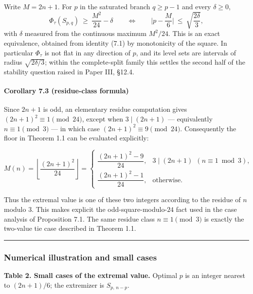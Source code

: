 \documentclass[english,11pt,a4paper]{article}
\begin{document}
Write \(M=2n+1\). For \(p\) in the saturated branch \(q\ge p-1\) and
every \(\delta\ge0\), \[
\Phi_\tau(S_{p,q})\ \ge\ \frac{M^2}{24}-\delta\qquad\Longleftrightarrow\qquad \Big|p-\frac{M}{6}\Big|\ \le\ \sqrt{\frac{2\delta}{3}},
\] with \(\delta\) measured from the continuous maximum \(M^2/24\). This
is an exact equivalence, obtained from identity (7.1) by monotonicity of
the square. In particular \(\Phi_\tau\) is not flat in any direction of
\(p\), and its level sets are intervals of radius \(\sqrt{2\delta/3}\);
within the complete-split family this settles the second half of the
stability question raised in Paper III, §12.4.

\paragraph{Corollary 7.3 (residue-class
formula)}\label{corollary-7.3-residue-class-formula}

Since \(2n+1\) is odd, an elementary residue computation gives
\((2n+1)^2\equiv1\pmod{24}\), except when \(3\mid(2n+1)\) ---
equivalently \(n\equiv1\pmod3\) --- in which case
\((2n+1)^2\equiv9\pmod{24}\). Consequently the floor in Theorem 1.1 can
be evaluated explicitly:

\[
M(n)=\left\lfloor\frac{(2n+1)^2}{24}\right\rfloor
=
\begin{cases}
\dfrac{(2n+1)^2-9}{24}, & 3\mid(2n+1)\ \ (n\equiv1\bmod3),\\[3mm]
\dfrac{(2n+1)^2-1}{24}, & \text{otherwise.}
\end{cases}
\]

Thus the extremal value is one of these two integers according to the
residue of \(n\) modulo \(3\). This makes explicit the
odd-square-modulo-\(24\) fact used in the case analysis of Proposition
7.1. The same residue class \(n\equiv1\pmod3\) is exactly the two-value
tie case described in Theorem 1.1.

\begin{center}\rule{0.5\linewidth}{0.5pt}\end{center}

\subsubsection{Numerical illustration and small
cases}\label{numerical-illustration-and-small-cases}

\textbf{Table 2. Small cases of the extremal value.} Optimal \(p\) is an
integer nearest to \((2n+1)/6\); the extremizer is \(S_{p,\,n-p}\).
\end{document}
